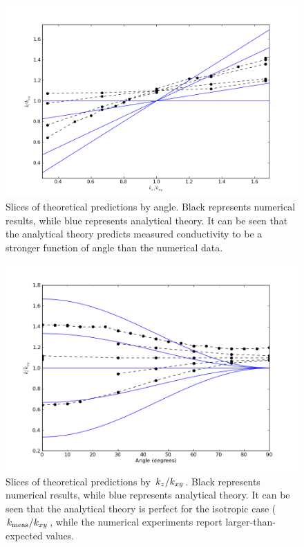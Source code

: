 \begin{figure}[h]
\centering
\includegraphics[width=\textwidth]{fig/byAngle.png}
\caption{Slices of theoretical predictions by angle. Black represents numerical results, while blue represents analytical theory. It can be seen that the analytical theory predicts measured conductivity to be a stronger function of angle than the numerical data.}
\label{fig:by_angle}
\end{figure}


\begin{figure}[h]
\centering
\includegraphics[width=\textwidth]{fig/byKratio.png}
\caption{Slices of theoretical predictions by \(\left.{k_z}\middle/{k_{xy}}\right.\). Black represents numerical results, while blue represents analytical theory. It can be seen that the analytical theory
is perfect for the isotropic case (\(\left.{k_{\textrm{meas}}}\middle/{k_{xy}}\right.\), while the numerical experiments report larger-than-expected values.}
\label{fig:by_kratio}
\end{figure}

